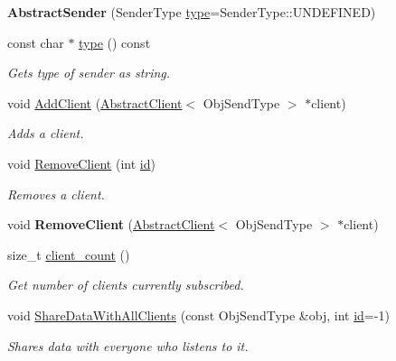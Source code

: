 \begin{DoxyCompactItemize}
\item 
\hypertarget{classdepth__clustering_1_1AbstractSender_ab04a328c2cc29a97bc3bba2b696c8786}{{\bfseries Abstract\-Sender} (Sender\-Type \hyperlink{classdepth__clustering_1_1AbstractSender_ad9da304185f766eb4b0035d6610caa49}{type}=Sender\-Type\-::\-U\-N\-D\-E\-F\-I\-N\-E\-D)}\label{classdepth__clustering_1_1AbstractSender_ab04a328c2cc29a97bc3bba2b696c8786}

\item 
const char $\ast$ \hyperlink{classdepth__clustering_1_1AbstractSender_ad9da304185f766eb4b0035d6610caa49}{type} () const 
\begin{DoxyCompactList}\small\item\em Gets type of sender as string. \end{DoxyCompactList}\item 
void \hyperlink{classdepth__clustering_1_1AbstractSender_aca33c29cca1916fb0a3edd9024a49b51}{Add\-Client} (\hyperlink{classdepth__clustering_1_1AbstractClient}{Abstract\-Client}$<$ Obj\-Send\-Type $>$ $\ast$client)
\begin{DoxyCompactList}\small\item\em Adds a client. \end{DoxyCompactList}\item 
void \hyperlink{classdepth__clustering_1_1AbstractSender_a0c33c98abe8fa71a86f02af95b1c71c1}{Remove\-Client} (int \hyperlink{classdepth__clustering_1_1Identifiable_a020b49a5102a2ef0eec7b9e74add7669}{id})
\begin{DoxyCompactList}\small\item\em Removes a client. \end{DoxyCompactList}\item 
\hypertarget{classdepth__clustering_1_1AbstractSender_ab331127e3e36b15413e1eecf55b5b284}{void {\bfseries Remove\-Client} (\hyperlink{classdepth__clustering_1_1AbstractClient}{Abstract\-Client}$<$ Obj\-Send\-Type $>$ $\ast$client)}\label{classdepth__clustering_1_1AbstractSender_ab331127e3e36b15413e1eecf55b5b284}

\item 
size\-\_\-t \hyperlink{classdepth__clustering_1_1AbstractSender_a957331eb41f11208bbe6174895c11bf2}{client\-\_\-count} ()
\begin{DoxyCompactList}\small\item\em Get number of clients currently subscribed. \end{DoxyCompactList}\item 
void \hyperlink{classdepth__clustering_1_1AbstractSender_a147752e5ab7ca15da9c8d8e60575390b}{Share\-Data\-With\-All\-Clients} (const Obj\-Send\-Type \&obj, int \hyperlink{classdepth__clustering_1_1Identifiable_a020b49a5102a2ef0eec7b9e74add7669}{id}=-\/1)
\begin{DoxyCompactList}\small\item\em Shares data with everyone who listens to it. \end{DoxyCompactList}\end{DoxyCompactItemize}
